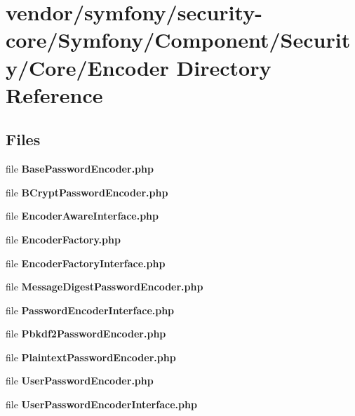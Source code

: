 \section{vendor/symfony/security-\/core/\+Symfony/\+Component/\+Security/\+Core/\+Encoder Directory Reference}
\label{dir_91b5ac83ab63cf4ef99df9de2e21b20c}
\subsection*{Files}
\begin{DoxyCompactItemize}
\item 
file {\bf Base\+Password\+Encoder.\+php}
\item 
file {\bf B\+Crypt\+Password\+Encoder.\+php}
\item 
file {\bf Encoder\+Aware\+Interface.\+php}
\item 
file {\bf Encoder\+Factory.\+php}
\item 
file {\bf Encoder\+Factory\+Interface.\+php}
\item 
file {\bf Message\+Digest\+Password\+Encoder.\+php}
\item 
file {\bf Password\+Encoder\+Interface.\+php}
\item 
file {\bf Pbkdf2\+Password\+Encoder.\+php}
\item 
file {\bf Plaintext\+Password\+Encoder.\+php}
\item 
file {\bf User\+Password\+Encoder.\+php}
\item 
file {\bf User\+Password\+Encoder\+Interface.\+php}
\end{DoxyCompactItemize}

